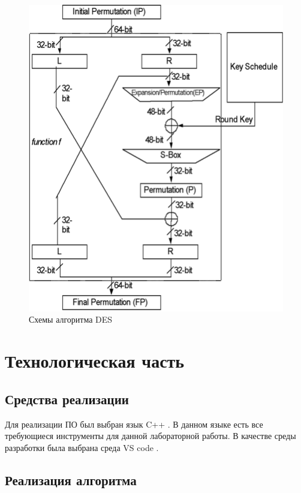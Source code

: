 \begin{figure}[h!]
	\centering
	\includegraphics[width=\textwidth]{assets/images/des.png}
	\caption{Схемы алгоритма DES}
	\label{fig:algo}
\end{figure}
\clearpage

\section{Технологическая часть}

\subsection{Средства реализации}

Для реализации ПО был выбран язык C++ \cite{c++}.
В данном языке есть все требующиеся инструменты для данной лабораторной работы.
В качестве среды разработки была выбрана среда VS code \cite{vscode}.

\subsection{Реализация алгоритма}

